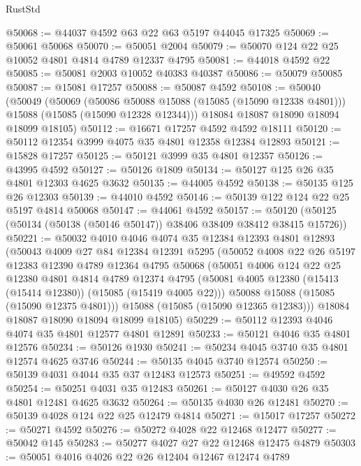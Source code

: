 \begin{lexlean}{RustStd}
\begin{coremodule}
@50068 := @44037 @4592 @63 @22 @63 @5197 @44045 @17325
@50069 := @50061 @50068
@50070 := @50051 @2004
@50079 := @50070 @124 @22 @25 @10052 @4801 @4814 @4789 @12337 @4795
@50081 := @44018 @4592 @22
@50085 := @50081 @2003 @10052 @40383 @40387
@50086 := @50079 @50085
@50087 := @15081 @17257
@50088 := @50087 @4592
@50108 := @50040
    (@50049
      (@50069
        (@50086 @50088 @15088 (@15085 (@15090 @12338 @4801)))
        @15088
        (@15085 (@15090 @12328 @12344)))
      @18084
      @18087
      @18090
      @18094
      @18099
      @18105)
@50112 := @16671 @17257 @4592 @4592 @18111
@50120 := @50112 @12354 @3999 @4075 @35 @4801 @12358 @12384 @12893
@50121 := @15828 @17257
@50125 := @50121 @3999 @35 @4801 @12357
@50126 := @43995 @4592
@50127 := @50126 @1809
@50134 := @50127 @125 @26 @35 @4801 @12303 @4625 @3632
@50135 := @44005 @4592
@50138 := @50135 @125 @26 @12303
@50139 := @44010 @4592
@50146 := @50139 @122 @124 @22 @25 @5197 @4814 @50068
@50147 := @44061 @4592
@50157 := @50120 (@50125 (@50134 (@50138 (@50146 @50147)) @38406 @38409 @38412 @38415 @15726))
@50221 := @50032
    @4010
    @4046
    @4074
    @35
    @12384
    @12393
    @4801
    @12893
    (@50043
      @4009
      @27
      @84
      @12384
      @12391
      @5295
      (@50052
        @4008
        @22
        @26
        @5197
        @12383
        @12390
        @4789
        @12364
        @4795
        @50068
        (@50051
          @4006
          @124
          @22
          @25
          @12380
          @4801
          @4814
          @4789
          @12374
          @4795
          (@50081 @4005 @12380 (@15413 (@15414 @12380)) (@15085 (@15419 @4005 @22)))
          @50088
          @15088
          (@15085 (@15090 @12375 @4801)))
        @15088
        (@15085 (@15090 @12365 @12383)))
      @18084
      @18087
      @18090
      @18094
      @18099
      @18105)
@50229 := @50112 @12393 @4046 @4074 @35 @4801 @12577 @4801 @12891
@50233 := @50121 @4046 @35 @4801 @12576
@50234 := @50126 @1930
@50241 := @50234 @4045 @3740 @35 @4801 @12574 @4625 @3746
@50244 := @50135 @4045 @3740 @12574
@50250 := @50139 @4031 @4044 @35 @37 @12483 @12573
@50251 := @49592 @4592
@50254 := @50251 @4031 @35 @12483
@50261 := @50127 @4030 @26 @35 @4801 @12481 @4625 @3632
@50264 := @50135 @4030 @26 @12481
@50270 := @50139 @4028 @124 @22 @25 @12479 @4814
@50271 := @15017 @17257
@50272 := @50271 @4592
@50276 := @50272 @4028 @22 @12468 @12477
@50277 := @50042 @145
@50283 := @50277 @4027 @27 @22 @12468 @12475 @4879
@50303 := @50051
    @4016
    @4026
    @22
    @26
    @12404
    @12467
    @12474
    @4789

\end{coremodule}
\end{lexlean}
